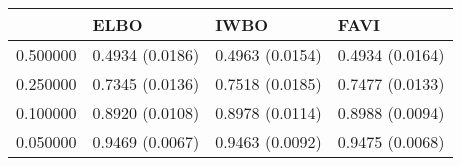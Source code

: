\begin{tabular}{llll}
\toprule
 & ELBO & IWBO & FAVI \\
\midrule
0.500000 & 0.4934 (0.0186) & 0.4963 (0.0154) & 0.4934 (0.0164) \\
0.250000 & 0.7345 (0.0136) & 0.7518 (0.0185) & 0.7477 (0.0133) \\
0.100000 & 0.8920 (0.0108) & 0.8978 (0.0114) & 0.8988 (0.0094) \\
0.050000 & 0.9469 (0.0067) & 0.9463 (0.0092) & 0.9475 (0.0068) \\
\bottomrule
\end{tabular}
